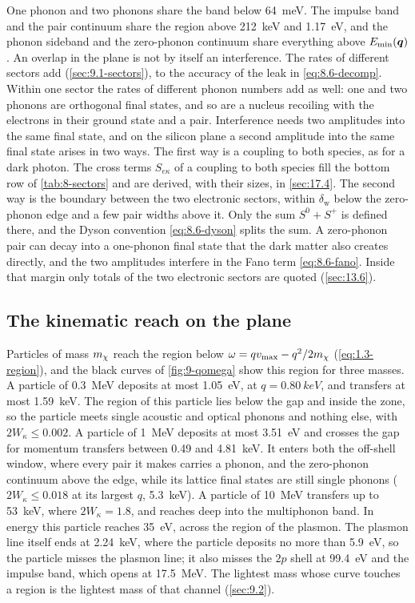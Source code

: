 One phonon and two phonons share the band below \SI{64}{meV}. The impulse band and the pair continuum share the region above \SI{212}{keV} and \SI{1.17}{eV}, and the phonon sideband and the zero-phonon continuum share everything above $E_{\mathrm{min}}(\bm{q})$. An overlap in the plane is not by itself an interference. The rates of different sectors add (\cref{sec:9.1-sectors}), to the accuracy of the leak in \cref{eq:8.6-decomp}. Within one sector the rates of different phonon numbers add as well: one and two phonons are orthogonal final states, and so are a nucleus recoiling with the electrons in their ground state and a pair. Interference needs two amplitudes into the same final state, and on the silicon plane a second amplitude into the same final state arises in two ways. The first way is a coupling to both species, as for a dark photon. The cross terms $S_{e\kappa}$ of a coupling to both species fill the bottom row of \cref{tab:8-sectors} and are derived, with their sizes, in \cref{sec:17.4}. The second way is the boundary between the two electronic sectors, within $\delta_{\mathrm{w}}$ below the zero-phonon edge and a few pair widths above it. Only the sum $S^0 + S^+$ is defined there, and the Dyson convention \cref{eq:8.6-dyson} splits the sum. A zero-phonon pair can decay into a one-phonon final state that the dark matter also creates directly, and the two amplitudes interfere in the Fano term \cref{eq:8.6-fano}. Inside that margin only totals of the two electronic sectors are quoted (\cref{sec:13.6}).

\subsection{The kinematic reach on the plane}\label{sec:9.3-reach}

Particles of mass $m_{\chi}$ reach the region below $\omega = qv_{\mathrm{max}} - q^2/2m_{\chi}$ (\cref{eq:1.3-region}), and the black curves of \cref{fig:9-qomega} show this region for three masses. A particle of \SI{0.3}{MeV} deposits at most \SI{1.05}{eV}, at $q = \SI{0.80}{keV}$, and transfers at most \SI{1.59}{keV}. The region of this particle lies below the gap and inside the zone, so the particle meets single acoustic and optical phonons and nothing else, with $2W_\kappa \le 0.002$. A particle of \SI{1}{MeV} deposits at most \SI{3.51}{eV} and crosses the gap for momentum transfers between 0.49 and \SI{4.81}{keV}. It enters both the off-shell window, where every pair it makes carries a phonon, and the zero-phonon continuum above the edge, while its lattice final states are still single phonons ($2W_\kappa \le 0.018$ at its largest $q$, \SI{5.3}{keV}). A particle of \SI{10}{MeV} transfers up to \SI{53}{keV}, where $2W_\kappa = 1.8$, and reaches deep into the multiphonon band. In energy this particle reaches \SI{35}{eV}, across the region of the plasmon. The plasmon line itself ends at \SI{2.24}{keV}, where the particle deposits no more than \SI{5.9}{eV}, so the particle misses the plasmon line; it also misses the $2p$ shell at \SI{99.4}{eV} and the impulse band, which opens at \SI{17.5}{MeV}. The lightest mass whose curve touches a region is the lightest mass of that channel (\cref{sec:9.2}).

